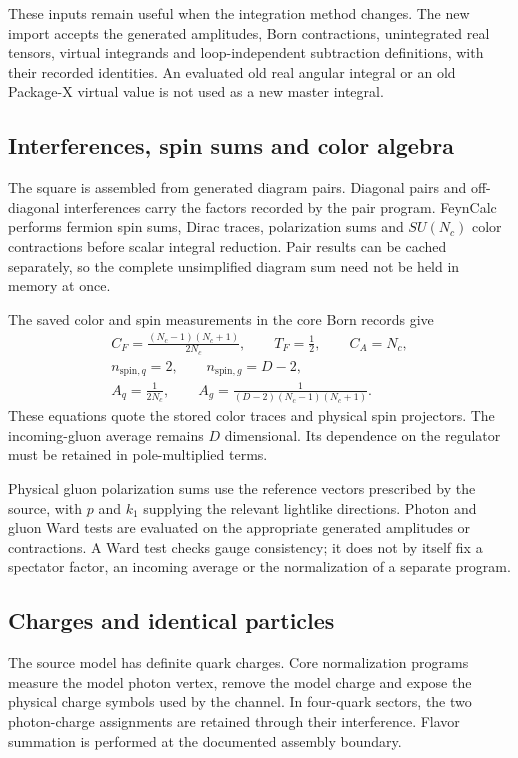 \documentclass[11pt,a4paper]{article}
\begin{document}
These inputs remain useful when the integration method changes. The new
import accepts the generated amplitudes, Born contractions, unintegrated
real tensors, virtual integrands and loop-independent subtraction
definitions, with their recorded identities. An evaluated old real
angular integral or an old Package-X virtual value is not used as a new
master integral.

\subsection{Interferences, spin sums and color algebra}

The square is assembled from generated diagram pairs. Diagonal pairs and
off-diagonal interferences carry the factors recorded by the pair
program. FeynCalc performs fermion spin sums, Dirac traces, polarization
sums and $SU(N_c)$ color contractions before scalar integral reduction.
Pair results can be cached separately, so the complete unsimplified
diagram sum need not be held in memory at once.

The saved color and spin measurements in the core Born records give
\begin{gather}
 C_F=\frac{(N_c-1)(N_c+1)}{2N_c},\qquad
 T_F=\frac12,\qquad C_A=N_c,\label{eq:color}\\
 n_{\mathrm{spin},q}=2,\qquad n_{\mathrm{spin},g}=D-2,\\
 A_q=\frac{1}{2N_c},\qquad
 A_g=\frac{1}{(D-2)(N_c-1)(N_c+1)}.
 \label{eq:averages}
\end{gather}
These equations quote the stored color traces and physical spin
projectors. The incoming-gluon average remains $D$ dimensional.
Its dependence on the regulator must be retained in pole-multiplied
terms.

Physical gluon polarization sums use the reference vectors prescribed
by the source, with $p$ and $k_1$ supplying the relevant lightlike
directions. Photon and gluon Ward tests are evaluated on the appropriate
generated amplitudes or contractions. A Ward test checks gauge
consistency; it does not by itself fix a spectator factor, an incoming
average or the normalization of a separate program.

\subsection{Charges and identical particles}

The source model has definite quark charges. Core normalization programs
measure the model photon vertex, remove the model charge and expose the
physical charge symbols used by the channel. In four-quark sectors,
the two photon-charge assignments are retained through their interference.
Flavor summation is performed at the documented assembly boundary.
\end{document}
